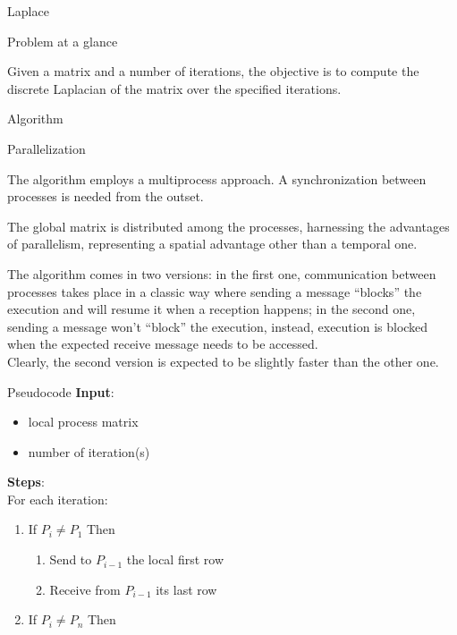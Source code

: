 \begin{chapter}{Laplace}
    \begin{section}{Problem at a glance}
        \par Given a matrix and a number of iterations, the objective is to compute the discrete Laplacian of the matrix over the specified iterations.
    \end{section}
    \begin{section}{Algorithm}
        \begin{subsection}{Parallelization}
            \par The algorithm employs a multiprocess approach. A synchronization between processes is needed from the outset.
            \par The global matrix is distributed among the processes, harnessing the advantages of parallelism, representing a spatial advantage other than a temporal one.
            \par The algorithm comes in two versions: in the first one, communication between processes takes place in a classic way where sending a message ``blocks'' the execution and will resume it when a reception happens; in the second one, sending a message won't ``block'' the execution, instead, execution is blocked when the expected receive message needs to be accessed.\\
            Clearly, the second version is expected to be slightly faster than the other one.
        \end{subsection}
        \begin{subsection}{Pseudocode}
            \textbf{Input}:
            \begin{itemize}
                \item local process matrix
                \item number of iteration(s)
            \end{itemize}
            \textbf{Steps}:\\
            For each iteration:
            \begin{enumerate}
                \item If $P_i \neq P_1$ Then
                \begin{enumerate}
                    \item Send to $P_{i-1}$ the local first row
                    \item Receive from $P_{i-1}$ its last row
                \end{enumerate}
                \item If $P_i \neq P_n$ Then

\end{enumerate}
\end{subsection}
\end{section}
\end{chapter}
